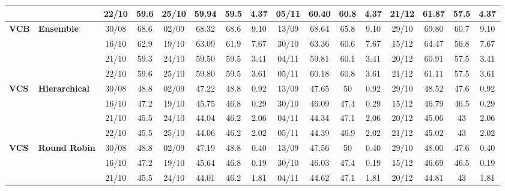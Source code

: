 \documentclass{ieeeaccess}
\begin{document}
\begin{table}[!h]
\begin{tabular}{llcc|cccc|cccc|cccc}
&
& 22/10 & 59.6 & 25/10 & 59.94 & 59.5 & 4.37 & 05/11 & 60.40 & 60.8 & 4.37 & 21/12 & 61.87 & 57.5 & 4.37 \\
\midrule

\multirow{4}{*}{\textbf{VCB}} 
& \textbf{Ensemble}
& 30/08 & 68.6 & 02/09 & 68.32 & 68.6 & 9.10 & 13/09 & 68.64 & 65.8 & 9.10 & 29/10 & 69.80 & 60.7 & 9.10 \\

&
& 16/10 & 62.9 & 19/10 & 63.09 & 61.9 & 7.67 & 30/10 & 63.36 & 60.6 & 7.67 & 15/12 & 64.47 & 56.8 & 7.67 \\

&
& 21/10 & 59.3 & 24/10 & 59.50 & 59.5 & 3.41 & 04/11 & 59.81 & 60.1 & 3.41 & 20/12 & 60.91 & 57.5 & 3.41 \\

&
& 22/10 & 59.6 & 25/10 & 59.80 & 59.5 & 3.61 & 05/11 & 60.18 & 60.8 & 3.61 & 21/12 & 61.11 & 57.5 & 3.61 \\
\midrule



\multirow{4}{*}{\textbf{VCS}} 
& \textbf{Hierarchical}
& 30/08 & 48.8 & 02/09 & 47.22 & 48.8 & 0.92 & 13/09 & 47.65 & 50 & 0.92 & 29/10 & 48.52 & 47.6 & 0.92 \\

&
& 16/10 & 47.2 & 19/10 & 45.75 & 46.8 & 0.29 & 30/10 & 46.09 & 47.4 & 0.29 & 15/12 & 46.79 & 46.5 & 0.29 \\

&
& 21/10 & 45.5 & 24/10 & 44.04 & 46.2 & 2.06 & 04/11 & 44.34 & 47.1 & 2.06 & 20/12 & 45.06 & 43 & 2.06 \\

&
& 22/10 & 45.5 & 25/10 & 44.06 & 46.2 & 2.02 & 05/11 & 44.39 & 46.9 & 2.02 & 21/12 & 45.02 & 43 & 2.02 \\
\midrule


\multirow{4}{*}{\textbf{VCS}} 
& \textbf{Round Robin}
& 30/08 & 48.8 & 02/09 & 47.19 & 48.8 & 0.40 & 13/09 & 47.56 & 50 & 0.40 & 29/10 & 48.00 & 47.6 & 0.40 \\

&
& 16/10 & 47.2 & 19/10 & 45.64 & 46.8 & 0.19 & 30/10 & 46.03 & 47.4 & 0.19 & 15/12 & 46.69 & 46.5 & 0.19 \\

&
& 21/10 & 45.5 & 24/10 & 44.01 & 46.2 & 1.81 & 04/11 & 44.62 & 47.1 & 1.81 & 20/12 & 44.81 & 43 & 1.81 \\


\end{tabular}
\end{table}
\end{document}
